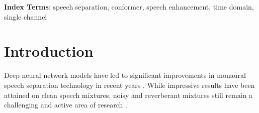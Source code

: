 





\begin{abstract}
Speech separation remains an important topic for multi-speaker technology researchers. 
\Acp{conformer} have performed well for many speech processing tasks but have been under-researched for speech separation. 
Most recent \ac{SOTA} separation models have been \acp{TasNet}.
A number of successful models have made use of \ac{DP} networks which sequentially process local and global information. 
\Acp{TD-Conformer} are an analogue of the \ac{DP} approach in that they also process local and global context sequentially but have a different time complexity function.
It is shown that for realistic shorter signal lengths, 
conformers are more efficient when controlling for feature dimension. 
Subsampling layers are proposed to further improve computational efficiency.
The best \ac{TD-Conformer} achieves ~dB and ~dB SISDR improvement on the WHAMR and WSJ0-2Mix benchmarks, respectively.
\end{abstract}
\noindent\textbf{Index Terms}: speech separation, conformer, speech enhancement, time domain, single channel

\section{Introduction}
Deep neural network models have led to significant improvements in monaural speech separation technology in recent years \cite{upit,tasnet,wdtcn,QDPN}. While impressive results have been attained on clean speech mixtures, noisy and reverberant mixtures still remain a challenging and active area of research \cite{FFASRHaebUmbach, MSA+13, WHAMR, atttasnet}.

